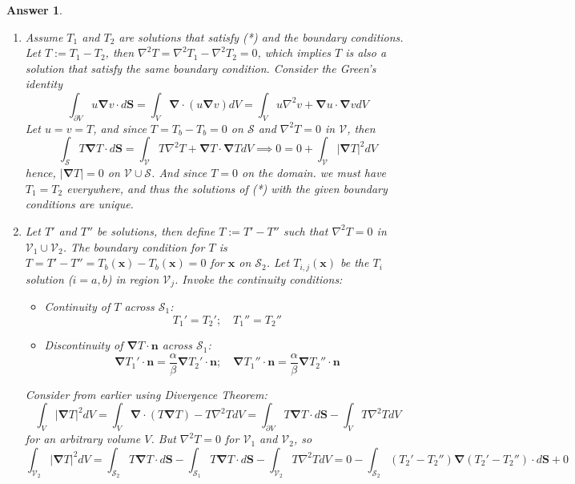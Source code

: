 \documentclass[a4paper]{article}
\newtheorem{ans}{Answer}[section]
\theoremstyle{new}
\begin{document}
\begin{ans}\leavevmode
\begin{enumerate}[label=(\roman*)]
\item Assume $T_1$ and $T_2$ are solutions that satisfy (*) and the boundary conditions. Let $T:=T_1-T_2$, then $\nabla^2T=\nabla^2T_1-\nabla^2T_2=0$, which implies $T$ is also a solution that satisfy the same boundary condition. Consider the Green's identity
$$\int_{\partial V}u\boldsymbol{\nabla}v\cdot d \mathbf{S}=\int_V\boldsymbol{\nabla}\cdot(u\boldsymbol{\nabla}v)dV=\int_Vu\nabla^2v+\boldsymbol{\nabla}u\cdot\boldsymbol{\nabla}vdV$$
Let $u=v=T$, and since $T=T_b-T_b=0$ on $\mathcal{S}$ and $\nabla^2T=0$ in $\mathcal{V}$, then
$$\int_{\mathcal{S}}T\boldsymbol{\nabla}T\cdot d\mathbf{S}=\int_{\mathcal{V}}T\nabla^2T+\boldsymbol{\nabla}T\cdot\boldsymbol{\nabla}TdV\implies 0=0+\int_{\mathcal{V}}|\boldsymbol{\nabla}T|^2dV$$
hence, $|\boldsymbol{\nabla}T|=0$ on $\mathcal{V}\cup\mathcal{S}$. And since $T=0$ on the domain. we must have $T_1=T_2$ everywhere, and thus the solutions of (*) with the given boundary conditions are unique.
\item Let $T'$ and $T''$ be solutions, then define $T:=T'-T''$ such that $\nabla^2T=0$ in $\mathcal{V}_1\cup\mathcal{V}_2$. The boundary condition for $T$ is $T=T'-T''=T_b(\mathbf{x})-T_b(\mathbf{x})=0$ for $\mathbf{x}$ on $\mathcal{S}_2$. Let $T_{i,j}(\mathbf{x})$ be the $T_i$ solution ($i=a,b$) in region $\mathcal{V}_j$. Invoke the continuity conditions:
\begin{itemize}
    \item Continuity of $T$ across $\mathcal{S}_1$:
    $$T_1'=T_2';\quad T_1''=T_2''$$
    \item Discontinuity of $\boldsymbol{\nabla}T\cdot\mathbf{n}$ across $\mathcal{S}_1$:
    $$\boldsymbol{\nabla}T_1'\cdot\mathbf{n}=\frac{\alpha}{\beta}\boldsymbol{\nabla}T_2'\cdot\mathbf{n};\quad \boldsymbol{\nabla}T_1''\cdot\mathbf{n}=\frac{\alpha}{\beta}\boldsymbol{\nabla}T_2''\cdot\mathbf{n}$$
\end{itemize}
Consider from earlier using Divergence Theorem:
$$\int_V|\boldsymbol{\nabla}T|^2dV=\int_V\boldsymbol{\nabla}\cdot (T\boldsymbol{\nabla}T)-T\nabla^2TdV=\int_{\partial V}T\boldsymbol{\nabla}T\cdot d\mathbf{S}-\int_VT\nabla^2TdV$$
for an arbitrary volume $V$. But $\nabla^2T=0$ for $\mathcal{V}_1$ and $\mathcal{V}_2$, so
$$\int_{\mathcal{V}_2}|\boldsymbol{\nabla}T|^2dV=\int_{\mathcal{S}_2}T\boldsymbol{\nabla}T\cdot d\mathbf{S}-\int_{\mathcal{S}_1}T\boldsymbol{\nabla}T\cdot d\mathbf{S}-\int_{\mathcal{V}_2}T\nabla^2TdV=0-\int_{\mathcal{S}_2}(T_2'-T_2'')\boldsymbol{\nabla}(T_2'-T_2'')\cdot d\mathbf{S}+0$$

\end{enumerate}
\end{ans}
\end{document}
